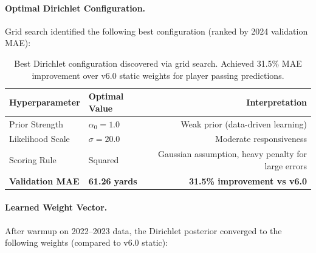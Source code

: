 \paragraph{Optimal Dirichlet Configuration.}
Grid search identified the following best configuration (ranked by 2024 validation MAE):
\begin{table}[htbp]
\centering
\caption[Optimal Dirichlet hyperparameters]{Best Dirichlet configuration discovered via grid search. Achieved 31.5\% MAE improvement over v6.0 static weights for player passing predictions.}
\label{tab:optimal-dirichlet-config}
\small
\setlength{\tabcolsep}{4pt}
\begin{tabular}{@{}llr@{}}
\toprule
\textbf{Hyperparameter} & \textbf{Optimal Value} & \textbf{Interpretation} \\
\midrule
Prior Strength & $\alpha_0 = 1.0$ & Weak prior (data-driven learning) \\
Likelihood Scale & $\sigma = 20.0$ & Moderate responsiveness \\
Scoring Rule & Squared & Gaussian assumption, heavy penalty for large errors \\
\midrule
\textbf{Validation MAE} & \textbf{61.26 yards} & \textbf{31.5\% improvement vs v6.0} \\
\bottomrule
\end{tabular}
\end{table}

\paragraph{Learned Weight Vector.}
After warmup on 2022--2023 data, the Dirichlet posterior converged to the following weights (compared to v6.0 static):

